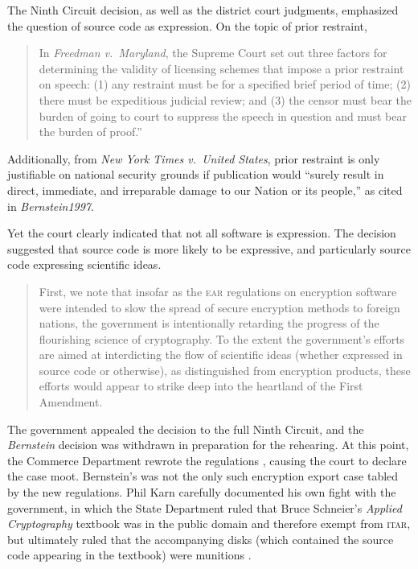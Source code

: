 \documentclass[12pt]{olfmemo}
\begin{document}
The Ninth Circuit decision, as well as the district court judgments, emphasized the question of source code as expression. On the topic of prior restraint,
\begin{quote}
In \textit{Freedman v.\ Maryland}, the Supreme Court set out three factors for determining the validity of licensing schemes that impose a prior restraint on speech: (1) any restraint must be for a specified brief period of time; (2) there must be expeditious judicial review; and (3) the censor must bear the burden of going to court to suppress the speech in question and must bear the burden of proof.''%
\citep[p.~4239]{Bernstein1997}
\end{quote}
Additionally, from \textit{New York Times v.\ United States}, prior restraint is only justifiable on national security grounds if publication would ``surely result in direct, immediate, and irreparable damage to our Nation or its people,'' \citep{NYTvUS} as cited in \textit{Bernstein1997}.

Yet the court clearly indicated that not all software is expression. The decision suggested that source code is more likely to be expressive, and particularly source code expressing scientific ideas.
\begin{quote}
First, we note that insofar as the \textsc{ear} regulations on encryption software were intended to slow the spread of secure encryption methods to foreign nations, the government is intentionally retarding the progress of the flourishing science of cryptography. To the extent the government's efforts are aimed at interdicting the flow of scientific ideas (whether expressed in source code or otherwise), as distinguished from encryption products, these efforts would appear to strike deep into the heartland of the First Amendment. \citep[p.~4242]{Bernstein1997}
\end{quote}

The government appealed the decision to the full Ninth Circuit, and the \textit{Bernstein} decision was withdrawn in preparation for the rehearing. At this point, the Commerce Department rewrote the regulations \citep{EncryptionRule2000}, causing the court to declare the case moot. Bernstein's was not the only such encryption export case tabled by the new regulations. Phil Karn carefully documented his own fight with the government, in which the State Department ruled that Bruce Schneier's \textit{Applied Cryptography} textbook was in the public domain and therefore exempt from \textsc{itar}, but ultimately ruled that the accompanying disks (which contained the source code appearing in the textbook) were munitions \citep{Karn1999}.
\end{document}
